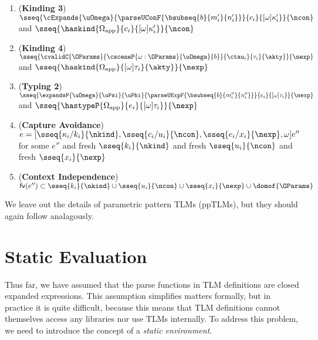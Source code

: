 \documentclass[acmsmall,10pt,review,anonymous]{acmart}\settopmatter{printfolios=true}
\begin{document}
\begin{theorem}
\begin{enumerate}[nolistsep]
  \item (\textbf{Kinding 3}) $\sseq{\cExpands{\uOmega}{\parseUConF{\bsubseq{b}{m'_i}{n'_i}}}{c_i}{[\omega]\kappa'_i}}{\ncon}$ and $\sseq{\haskind{\Omega_\text{app}}{c_i}{[\omega]\kappa'_i}}{\ncon}$
  \item (\textbf{Kinding 4}) $\sseq{\cvalidC{\OParams}{\csceneP{\omega : \OParams}{\uOmega}{b}}{\ctau_i}{\tau_i}{\akty}}{\nexp}$ and $\sseq{\haskind{\Omega_\text{app}}{[\omega]\tau_i}{\akty}}{\nexp}$
  \item (\textbf{Typing 2}) $\sseq{\expandsP{\uOmega}{\uPsi}{\uPhi}{\parseUExpF{\bsubseq{b}{m''_i}{n''_i}}}{e_i}{[\omega]\tau_i}}{\nexp}$ and $\sseq{\hastypeP{\Omega_\text{app}}{e_i}{[\omega]\tau_i}}{\nexp}$
  \item (\textbf{Capture Avoidance}) $e = [\sseq{\kappa_i/k_i}{\nkind}, \sseq{c_i/u_i}{\ncon}, \sseq{e_i/x_i}{\nexp}, \omega]e''$ for some $e''$ and fresh $\sseq{k_i}{\nkind}$ and fresh $\sseq{u_i}{\ncon}$ and fresh $\sseq{x_i}{\nexp}$
  \item (\textbf{Context Independence}) $\mathsf{fv}(e'') \subset \sseq{k_i}{\nkind} \cup \sseq{u_i}{\ncon} \cup \sseq{x_i}{\nexp} \cup \domof{\OParams}$
\end{enumerate}
\end{theorem}
We leave out the details of parametric pattern TLMs (ppTLMs), but they should again follow analagously.

\newcommand{\staticEvalSec}{Static Evaluation}
\section{\protect\staticEvalSec}
\label{sec:static-eval}

Thus far, we have assumed that the parse functions in TLM definitions are closed expanded expressions. This assumption simplifies matters formally, but in practice it is quite difficult, because this means that TLM definitions cannot themselves access any libraries nor use TLMs internally. To address this problem, we need to introduce the concept of a \emph{static environment}. 
\end{document}
